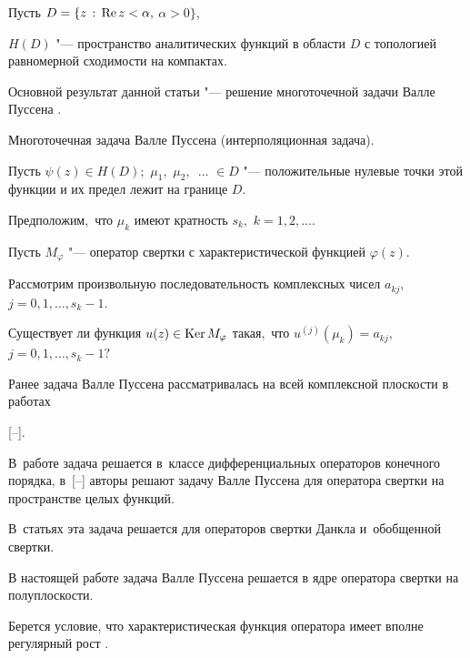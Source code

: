 Пусть $D=\{z \, :\, \mathop{\rm Re} z<\alpha,$ $ \alpha>0\}$, 

$H(D)$ "--- пространство аналитических функций в области $D$ с топологией равномерной сходимости на компактах.

Основной результат данной статьи "--- решение многоточечной задачи Валле Пуссена \cite{zabirova0.0}. 




\smallskip

{\small \sc Многоточечная задача Валле Пуссена (интерполяционная задача).} \it

Пусть $\psi(z)\in H(D);$ $\mu_1,$ $\mu_2,$~$\ldots$ $\in D$ "--- положительные нулевые точки этой функции и их предел лежит на границе $D.$ 

Предположим$,$ что $\mu_k$ имеют кратность $s_k,$ $k=1, 2, \dots.$

Пусть $M_{\varphi}$ "--- оператор свертки с характеристической функцией $\varphi(z).$ 

Рассмотрим произвольную последовательность комплексных чисел $a_{kj},$ $j=0, 1, \dots,s_k-1.$

Существует ли функция $u(z) \in \mathop{\rm Ker}M_\varphi$ такая$,$ что $u^{(j)}(\mu_{k})=a_{kj},$ $j=0, 1,\dots,s_k-1?$

\smallskip

\rm



Ранее задача Валле Пуссена  рассматривалась на всей комплексной плоскости в работах 

[--]. 

В~работе \cite{zabirova7} задача решается в~классе дифференциальных операторов конечного порядка, в~[--] авторы решают задачу Валле Пуссена для оператора свертки на пространстве целых функций. 

В~статьях \cite{zabirova0.2, zabirova0.4} эта задача решается для операторов свертки Данкла и~обобщенной свертки.



В настоящей работе задача Валле Пуссена \cite{zabirova0.0} решается в ядре оператора свертки на полуплоскости. 

Берется условие, что характеристическая функция оператора имеет вполне регулярный рост \cite[c.~182]{zabirova1}. 



\smallskip



